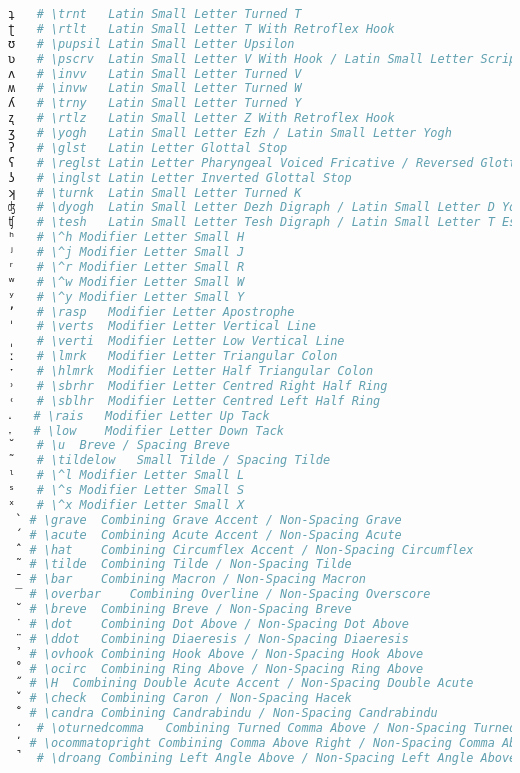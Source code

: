 \begin{lstlisting}[language=Julia, linewidth=\textwidth]
ʇ   # \trnt   Latin Small Letter Turned T
ʈ   # \rtlt   Latin Small Letter T With Retroflex Hook
ʊ   # \pupsil Latin Small Letter Upsilon
ʋ   # \pscrv  Latin Small Letter V With Hook / Latin Small Letter Script V
ʌ   # \invv   Latin Small Letter Turned V
ʍ   # \invw   Latin Small Letter Turned W
ʎ   # \trny   Latin Small Letter Turned Y
ʐ   # \rtlz   Latin Small Letter Z With Retroflex Hook
ʒ   # \yogh   Latin Small Letter Ezh / Latin Small Letter Yogh
ʔ   # \glst   Latin Letter Glottal Stop
ʕ   # \reglst Latin Letter Pharyngeal Voiced Fricative / Reversed Glottal Stop
ʖ   # \inglst Latin Letter Inverted Glottal Stop
ʞ   # \turnk  Latin Small Letter Turned K
ʤ   # \dyogh  Latin Small Letter Dezh Digraph / Latin Small Letter D Yogh
ʧ   # \tesh   Latin Small Letter Tesh Digraph / Latin Small Letter T Esh
ʰ   # \^h Modifier Letter Small H
ʲ   # \^j Modifier Letter Small J
ʳ   # \^r Modifier Letter Small R
ʷ   # \^w Modifier Letter Small W
ʸ   # \^y Modifier Letter Small Y
ʼ   # \rasp   Modifier Letter Apostrophe
ˈ   # \verts  Modifier Letter Vertical Line
ˌ   # \verti  Modifier Letter Low Vertical Line
ː   # \lmrk   Modifier Letter Triangular Colon
ˑ   # \hlmrk  Modifier Letter Half Triangular Colon
˒   # \sbrhr  Modifier Letter Centred Right Half Ring
˓   # \sblhr  Modifier Letter Centred Left Half Ring
˔   # \rais   Modifier Letter Up Tack
˕   # \low    Modifier Letter Down Tack
˘   # \u  Breve / Spacing Breve
˜   # \tildelow   Small Tilde / Spacing Tilde
ˡ   # \^l Modifier Letter Small L
ˢ   # \^s Modifier Letter Small S
ˣ   # \^x Modifier Letter Small X
 ̀  # \grave  Combining Grave Accent / Non-Spacing Grave
 ́  # \acute  Combining Acute Accent / Non-Spacing Acute
 ̂  # \hat    Combining Circumflex Accent / Non-Spacing Circumflex
 ̃  # \tilde  Combining Tilde / Non-Spacing Tilde
 ̄  # \bar    Combining Macron / Non-Spacing Macron
 ̅  # \overbar    Combining Overline / Non-Spacing Overscore
 ̆  # \breve  Combining Breve / Non-Spacing Breve
 ̇  # \dot    Combining Dot Above / Non-Spacing Dot Above
 ̈  # \ddot   Combining Diaeresis / Non-Spacing Diaeresis
 ̉  # \ovhook Combining Hook Above / Non-Spacing Hook Above
 ̊  # \ocirc  Combining Ring Above / Non-Spacing Ring Above
 ̋  # \H  Combining Double Acute Accent / Non-Spacing Double Acute
 ̌  # \check  Combining Caron / Non-Spacing Hacek
 ̐  # \candra Combining Candrabindu / Non-Spacing Candrabindu
 ̒  # \oturnedcomma   Combining Turned Comma Above / Non-Spacing Turned Comma Above
 ̕  # \ocommatopright Combining Comma Above Right / Non-Spacing Comma Above Right
 ̚  # \droang Combining Left Angle Above / Non-Spacing Left Angle Above

\end{lstlisting}
